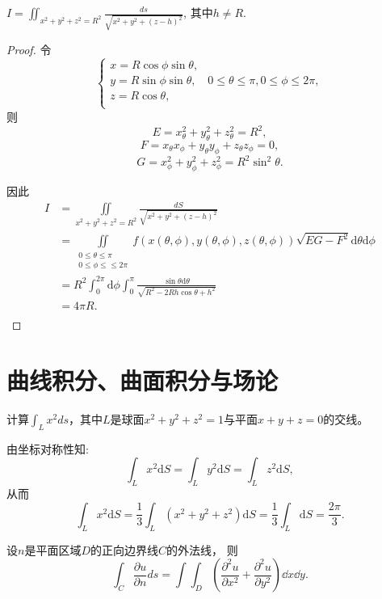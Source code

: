   \begin{exercise}
   $I=\iint_{x^2+y^2+z^2=R^2}\frac{ds}{\sqrt{x^2+y^2+(z-h)^2}}$,
   其中$h\neq R$. %
  \end{exercise} 
  
  \begin{proof}
  令
  \[
	\begin{cases}
	x=R\cos\phi\sin\theta,&\\
	y=R\sin\phi\sin\theta,&0\leq\theta\leq\pi,0\leq\phi\leq2\pi,\\
	z=R\cos\theta,\\
	\end{cases}  
  \]
则$$E=x_{\theta}^2+y_{\theta}^2+z_{\theta}^2=R^2,$$
$$F=x_{\theta}x_{\phi}+y_{\theta}y_{\phi}+z_{\theta}z_{\phi}=0,$$
$$G=x_{\phi}^2+y_{\phi}^2+z_{\phi}^2=R^2\sin^2\theta.$$

因此
\begin{align*}
I&=\iint\limits_{x^2+y^2+z^2=R^2}\frac{dS}{\sqrt{x^2+y^2+(z-h)^2}}\\
&=\iint\limits_{\substack{0\leq\theta\leq\pi\\0\leq\phi\leq\leq2\pi}}f(x(\theta,\phi),y(\theta,\phi),z(\theta,\phi))\sqrt{EG-F^2}\mathrm{d}\theta\mathrm{d}\phi\\
&=R^2\int_0^{2\pi}\mathrm{d}\phi\int_0^{\pi}\frac{\sin\theta\mathrm{d}\theta}{\sqrt{R^2-2Rh\cos\theta+h^2}}\\
&=4\pi R.\\
\end{align*}
\end{proof}

\section{曲线积分、曲面积分与场论}  
  
\begin{exercise}
计算$\int_Lx^2ds$，其中$L$是球面$x^2+y^2+z^2=1$与平面$x+y+z=0$的交线。%
   
  
   由坐标对称性知:
  $$\int_Lx^2\mathrm{d}S=\int_Ly^2\mathrm{d}S=\int_Lz^2\mathrm{d}S,$$
  从而$$\int_Lx^2\mathrm{d}S=\frac{1}{3}\int_L(x^2+y^2+z^2)\mathrm{d}S=\frac{1}{3}\int_L\mathrm{d}S=\frac{2\pi}{3}.$$
 
\end{exercise}

  \begin{exercise}
  设$n$是平面区域$D$的正向边界线$C$的外法线，
  则$$\int_C\frac{\partial u}{\partial n}ds=\int\int_D(\frac{\partial^2u}{\partial x^2}+\frac{\partial^2u}{\partial y^2})\dd x\dd y.$$ 
  \end{exercise}

